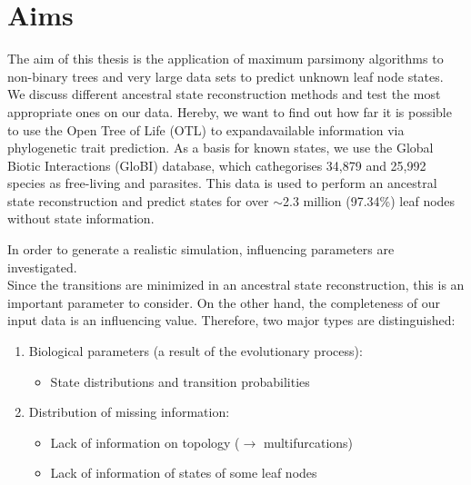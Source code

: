 \chapter{Aims}
  The aim of this thesis is the application of maximum parsimony algorithms to non-binary trees and 
    very large data sets to predict unknown leaf node states. \\
  We discuss different ancestral state reconstruction methods and test the most appropriate ones on 
    our data. Hereby, we want to find out how far it is possible to use the Open Tree of Life (OTL) 
    to expandavailable information via phylogenetic trait prediction. As a basis for known states, 
    we use the Global Biotic Interactions (GloBI) database, which cathegorises 34,879 and 25,992 
    species as free-living and parasites. This data is used to perform an ancestral state 
    reconstruction and predict states for over $\sim$2.3 million (97.34\%) leaf nodes without state 
    information.

  In order to generate a realistic simulation, influencing parameters are investigated. \\
  Since the transitions are minimized in an ancestral state reconstruction, this is an important 
    parameter to consider. On the other hand, the completeness of our input data is an influencing 
    value. Therefore, two major types are distinguished:
  \begin{enumerate}
    \item Biological parameters (a result of the evolutionary process):
      \begin{itemize}
        \item State distributions and transition probabilities
      \end{itemize}
    \item Distribution of missing information:
      \begin{itemize}
        \item Lack of information on topology ($\rightarrow$ multifurcations)
        \item Lack of information of states of some leaf nodes
      \end{itemize}
  \end{enumerate}

